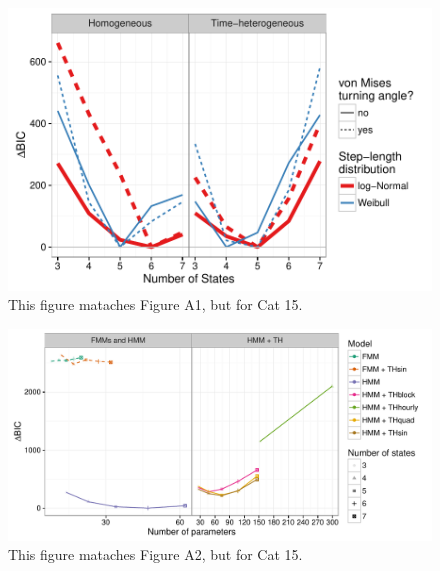 \documentclass{article}\usepackage[]{graphicx}\usepackage{xcolor}
\makeatletter
\def\maxwidth{ %
  \ifdim\Gin@nat@width>\linewidth
    \linewidth
  \else
    \Gin@nat@width
  \fi
}
\newenvironment{knitrout}{}{} %
\makeatother
\begin{document}
\clearpage

\begin{knitrout}
\color{fgcolor}\begin{figure}
\includegraphics[width=\maxwidth]{figure/BICred_plot15-1} \caption{This figure mataches Figure A1, but for Cat 15.}\label{fig:BICred_plot15}
\end{figure}


\end{knitrout}


\clearpage

\begin{knitrout}
\color{fgcolor}\begin{figure}
\includegraphics[width=\maxwidth]{figure/adj_BIC_comparisons15-1} \caption{This figure mataches Figure A2, but for Cat 15.}\label{fig:adj_BIC_comparisons15}
\end{figure}


\end{knitrout}
\end{document}
